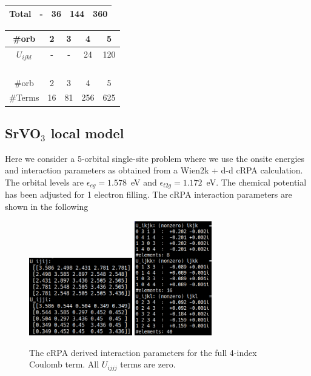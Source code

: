 \documentclass[12pt,a4paper]{scrartcl}
\numberwithin{equation}{section}
\begin{document}
\begin{center}
\begin{tabular}{|c||c|c|c|c|}
 Total  & - & 36 & 144 & 360 \\\hline
\end{tabular}
% 
\hspace*{0.3cm}
\begin{tabular}{|c||c|c|c|c|}
\hline
 \#orb & 2 & 3 & 4 & 5 \\\hline
 $U_{ijkl}$ & - & -  & 24 & 120 \\\hline
 \multicolumn{5}{c}{ } \\
 \multicolumn{5}{c}{ } \\
 \multicolumn{5}{c}{ } \\
 \multicolumn{5}{c}{ } \\\hline
 \#orb & 2 & 3 & 4 & 5 \\\hline
 \#Terms      & 16 & 81  & 256 & 625 \\\hline
\end{tabular}
\end{center}



\subsection{SrVO$_3$ local model}
Here we consider a 5-orbital single-site problem where we use the onsite energies and interaction parameters
as obtained from a Wien2k + d-d cRPA calculation. The orbital levels are $\epsilon_{eg} = 1.578$~eV and $\epsilon_{t2g} = 1.172$~eV.
The chemical potential has been adjusted for 1 electron filling.
The cRPA interaction parameters are shown in the following
\begin{figure}[h]
 \includegraphics[width=0.4\textwidth]{figs/nonHund/svo_crpa1.png}
 \includegraphics[width=0.3\textwidth]{figs/nonHund/svo_crpa2.png}
 \caption{The cRPA derived interaction parameters for the full 4-index Coulomb term. All $U_{ijjj}$ terms are zero.}
\end{figure}
\end{document}

